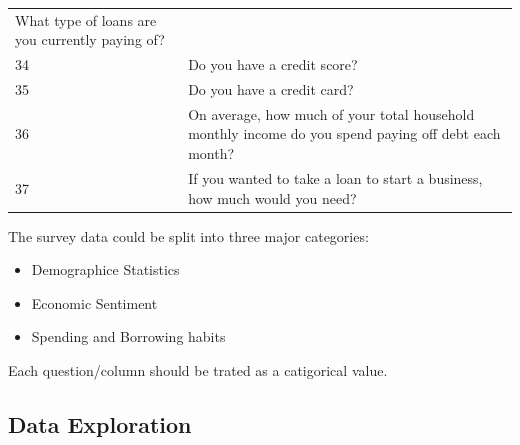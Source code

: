 \begin{longtable}[]{@{}ll@{}}
\begin{minipage}[t]{0.89\columnwidth}
What type of loans are you currently paying of?\strut
\end{minipage}\tabularnewline
\begin{minipage}[t]{0.05\columnwidth}\raggedright
34\strut
\end{minipage} & \begin{minipage}[t]{0.89\columnwidth}\raggedright
Do you have a credit score?\strut
\end{minipage}\tabularnewline
\begin{minipage}[t]{0.05\columnwidth}\raggedright
35\strut
\end{minipage} & \begin{minipage}[t]{0.89\columnwidth}\raggedright
Do you have a credit card?\strut
\end{minipage}\tabularnewline
\begin{minipage}[t]{0.05\columnwidth}\raggedright
36\strut
\end{minipage} & \begin{minipage}[t]{0.89\columnwidth}\raggedright
On average, how much of your total household monthly income do you spend
paying off debt each month?\strut
\end{minipage}\tabularnewline
\begin{minipage}[t]{0.05\columnwidth}\raggedright
37\strut
\end{minipage} & \begin{minipage}[t]{0.89\columnwidth}\raggedright
If you wanted to take a loan to start a business, how much would you
need?\strut
\end{minipage}\tabularnewline
\bottomrule
\end{longtable}

The survey data could be split into three major categories:

\begin{itemize}
\tightlist
\item
  Demographice Statistics
\item
  Economic Sentiment
\item
  Spending and Borrowing habits
\end{itemize}

Each question/column should be trated as a catigorical value.

\hypertarget{data-exploration}{%
\subsection{Data Exploration}\label{data-exploration}}

